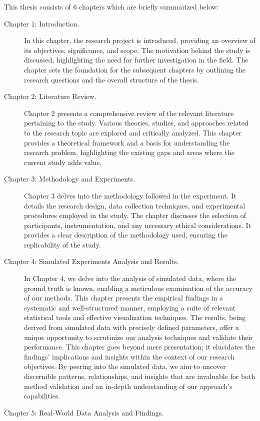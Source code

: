 \noindent
This thesis consists of 6 chapters which are briefly summarized below:
\begin{description}
\item [Chapter 1: Introduction.] 
In this chapter, the research project is introduced, providing an overview of its objectives, significance, and scope. The motivation behind the study is discussed, highlighting the need for further investigation in the field. The chapter sets the foundation for the subsequent chapters by outlining the research questions and the overall structure of the thesis.
\item [Chapter 2: Literature Review.]
Chapter 2 presents a comprehensive review of the relevant literature pertaining to the study. Various theories, studies, and approaches related to the research topic are explored and critically analyzed. This chapter provides a theoretical framework and a basis for understanding the research problem, highlighting the existing gaps and areas where the current study adds value.
\item [Chapter 3: Methodology and Experiments.]
Chapter 3 delves into the methodology followed in the experiment. It details the research design, data collection techniques, and experimental procedures employed in the study. The chapter discusses the selection of participants, instrumentation, and any necessary ethical considerations. It provides a clear description of the methodology used, ensuring the replicability of the study.
\item [Chapter 4: Simulated Experiments Analysis and Results.] 
In Chapter 4, we \linebreak delve into the analysis of simulated data, where the ground truth is known, enabling a meticulous examination of the accuracy of our methods. This chapter presents the empirical findings in a systematic and well-structured manner, employing a suite of relevant statistical tools and effective visualization techniques. The results, being derived from simulated data with precisely defined parameters, offer a unique opportunity to scrutinize our analysis techniques and validate their performance. This chapter goes beyond mere presentation; it elucidates the findings' implications and insights within the context of our research objectives. By peering into the simulated data, we aim to uncover discernible patterns, relationships, and insights that are invaluable for both method validation and an in-depth understanding of our approach's capabilities.
\item [Chapter 5: Real-World Data Analysis and Findings.]

\end{description}
